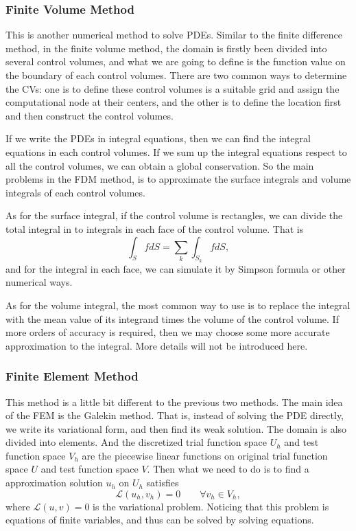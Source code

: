 \documentclass[english, nochinese]{pkupaper}
\begin{document}
\subsubsection{Finite Volume Method}
\par This is another numerical method to solve PDEs. Similar to the finite difference method, in the finite volume method, the domain is firstly been divided into several control volumes, and what we are going to define is the function value on the boundary of each control volumes. There are two common ways to determine the CVs: one is to define these control volumes is a suitable grid and assign the computational node at their centers, and the other is to define the location first and then construct the control volumes. 
\par If we write the PDEs in integral equations, then we can find the integral equations in each control volumes. If we sum up the integral equations respect to all the control volumes, we can obtain a global conservation. So the main problems in the FDM method, is to approximate the surface integrals and volume integrals of each control volumes.
\par As for the surface integral, if the control volume is rectangles, we can divide the total integral in to integrals in each face of the control volume. That is
\begin{equation}
	\int_S fdS = \sum_k\int_{S_k} fdS,
\end{equation}
and for the integral in each face, we can simulate it by Simpson formula or other numerical ways.
\par As for the volume integral, the most common way to use is to replace the integral with the mean value of its integrand times the volume of the control volume. If more orders of accuracy is required, then we may choose some more accurate approximation to the integral. More details will not be introduced here.

\subsubsection{Finite Element Method}
\par This method is a little bit different to the previous two methods. The main idea of the FEM is the Galekin method. That is, instead of solving the PDE directly, we write its variational form, and then find its weak solution. The domain is also divided into elements. And the discretized trial function space $U_h$ and test function space $V_h$ are the piecewise linear functions on original trial function space $U$ and test function space $V$. Then what we need to do is to find a approximation solution $u_h$ on $U_h$ satisfies
\begin{equation}
	\mathcal{L}(u_h, v_h) = 0\qquad \forall v_h\in V_h,
\end{equation}
where $\mathcal{L}(u, v) = 0$ is the variational problem. Noticing that this problem is equations of finite variables, and thus can be solved by solving equations.
\end{document}
